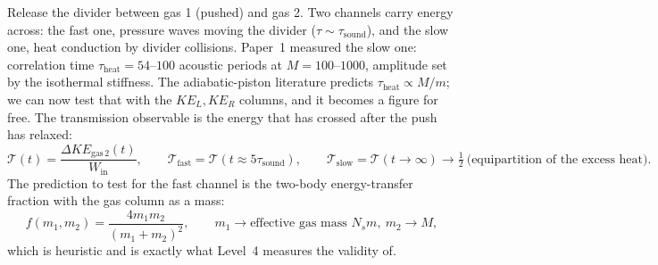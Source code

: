 \documentclass[11pt,a4paper]{article}
\begin{document}
Release the divider between gas 1 (pushed) and gas 2. Two channels carry energy across: the fast one, pressure waves moving the divider ($\tau \sim \tau_{\mathrm{sound}}$), and the slow one, heat conduction by divider collisions. Paper~1 measured the slow one: correlation time $\tau_{\mathrm{heat}} = 54$--$100$ acoustic periods at $M = 100$--$1000$, amplitude set by the isothermal stiffness. The adiabatic-piston literature predicts $\tau_{\mathrm{heat}} \propto M/m$; we can now test that with the $KE_L, KE_R$ columns, and it becomes a figure for free. The transmission observable is the energy that has crossed after the push has relaxed:
\begin{equation}
\mathcal T(t) = \frac{\Delta KE_{\mathrm{gas\,2}}(t)}{W_{\mathrm{in}}},\qquad
\mathcal T_{\mathrm{fast}} = \mathcal T(t \approx 5\tau_{\mathrm{sound}}),\qquad
\mathcal T_{\mathrm{slow}} = \mathcal T(t \to \infty) \to \tfrac12\ \text{(equipartition of the excess heat)}.
\label{eq:transmission}
\end{equation}
The prediction to test for the fast channel is the two-body energy-transfer fraction with the gas column as a mass:
\begin{equation}
f(m_1, m_2) = \frac{4m_1m_2}{(m_1+m_2)^2},\qquad m_1 \to \text{effective gas mass } N_s m,\ m_2 \to M,
\label{eq:twobody}
\end{equation}
which is heuristic and is exactly what Level~4 measures the validity of.
\end{document}
